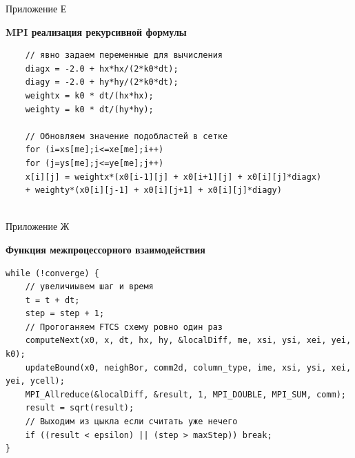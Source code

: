 \documentclass[a4paper]{extarticle}
\begin{document}
\newpage

\begin{flushright}Приложение Е\end{flushright}
\centerline{\textbf{MPI реализация рекурсивной формулы}}
\begin{verbatim}
	// явно задаем переменные для вычисления
	diagx = -2.0 + hx*hx/(2*k0*dt);
	diagy = -2.0 + hy*hy/(2*k0*dt);
	weightx = k0 * dt/(hx*hx);
	weighty = k0 * dt/(hy*hy);
	
	// Обновляем значение подобластей в сетке
	for (i=xs[me];i<=xe[me];i++)
	for (j=ys[me];j<=ye[me];j++)
	x[i][j] = weightx*(x0[i-1][j] + x0[i+1][j] + x0[i][j]*diagx)
	+ weighty*(x0[i][j-1] + x0[i][j+1] + x0[i][j]*diagy)
	
\end{verbatim}

\newpage

\begin{flushright}Приложение Ж\end{flushright}
\centerline{\textbf{Функция межпроцессорного взаимодействия}}
\begin{verbatim}
while (!converge) {
	// увеличиывем шаг и время
	t = t + dt;
	step = step + 1;
	// Прогоганяем FTCS схему ровно один раз
	computeNext(x0, x, dt, hx, hy, &localDiff, me, xsi, ysi, xei, yei, k0);
	updateBound(x0, neighBor, comm2d, column_type, ime, xsi, ysi, xei, yei, ycell);
	MPI_Allreduce(&localDiff, &result, 1, MPI_DOUBLE, MPI_SUM, comm);
	result = sqrt(result);
	// Выходим из цыкла если считать уже нечего
	if ((result < epsilon) || (step > maxStep)) break;
}

\end{verbatim}
%
%
%
\end{document}
